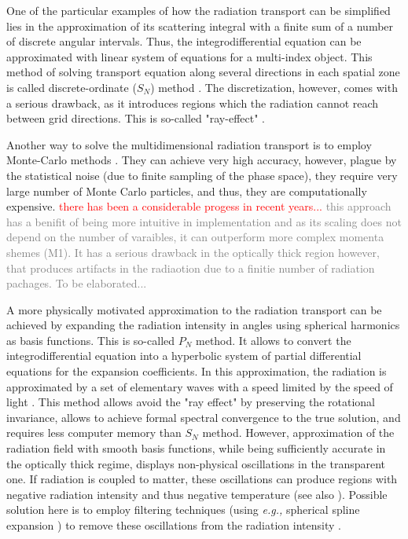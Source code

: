 \documentclass[11pt,a4paper,headinclude=true,DIV=14,BCOR=8mm,chapterprefix,listof=totoc,twoside,openright,abstracton]{scrbook}
\newcommand{\red}[1]{\textcolor{red}{#1}}
\newcommand{\gray}[1]{\textcolor{gray}{#1}}
\begin{document}
One of the particular examples of how the radiation transport can be simplified lies in the approximation of its scattering integral with a finite sum of a number of discrete angular intervals. Thus, the integrodifferential equation can be approximated with linear system of equations for a multi-index object. This method of solving transport equation along several directions in each spatial zone is called discrete-ordinate ($S_N$) method \cite{Castor:2004,Ott:2008jb,Sumiyoshi:2012za,Godoy:2012}. The discretization, however, comes with a serious drawback, as it introduces regions which the radiation cannot reach between grid directions. This is so-called "ray-effect" \cite{Morel:2003}.

Another way to solve the multidimensional radiation transport is to employ Monte-Carlo methods \cite{Fleck:1971,Gentile:2009,Abdikamalov:2012zi}. They can achieve very high accuracy, however, plague by the statistical noise (due to finite sampling of the phase space), they require very large number of Monte Carlo particles, and thus, they are computationally expensive. \red{there has been a considerable progess in recent years...} \gray{this approach has a benifit of being more intuitive in implementation and as its scaling does not depend on the number of varaibles, it can outperform more complex momenta shemes (M1). It has a serious drawback in the optically thick region however, that produces artifacts in the radiaotion due to a finitie number of radiation pachages. To be elaborated...}

A more physically motivated approximation to the radiation transport can be achieved by expanding the radiation intensity in angles using spherical harmonics as basis functions. This is so-called $P_N$ method. It allows to convert the integrodifferential equation into a hyperbolic system of partial differential equations for the expansion coefficients. In this approximation, the radiation is approximated by a set of elementary waves with a speed limited by the speed of light \cite{McClarren:2008b}. This method allows avoid the "ray effect" by preserving the rotational invariance, allows to achieve formal spectral convergence to the true solution, and requires less computer memory than $S_N$ method. However, approximation of the radiation field with smooth basis functions, while being sufficiently accurate in the optically thick regime, displays non-physical oscillations in the transparent one. If radiation is coupled to matter, these oscillations can produce regions with negative radiation intensity and thus negative temperature \cite{McClarren:2008b,Olson:2009} (see also \cite{Olson:2000,Olson:2009,Brunner:2001,McClarren:2010,Olson:2012,Hauck:2010}). Possible solution here is to employ filtering techniques (using \textit{e.g.,} spherical spline expansion \cite{Boyd:2001}) to remove these oscillations from the radiation intensity \cite{McClarren:2010}.
\end{document}
